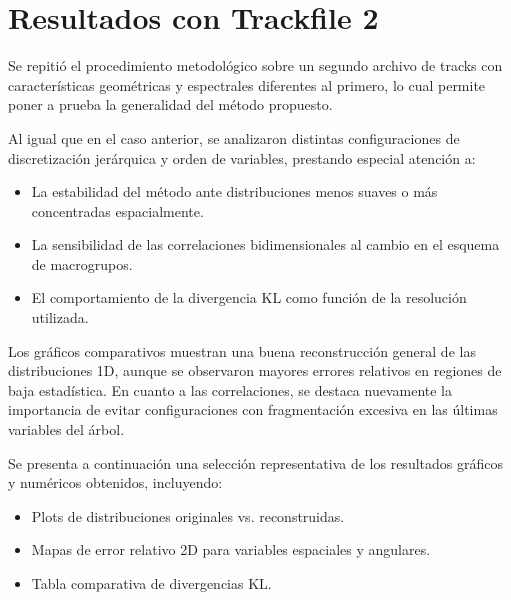 \section{Resultados con Trackfile 2}
\label{sec:resultados-track2}

Se repitió el procedimiento metodológico sobre un segundo archivo de tracks con características geométricas y espectrales diferentes al primero, lo cual permite poner a prueba la generalidad del método propuesto.

Al igual que en el caso anterior, se analizaron distintas configuraciones de discretización jerárquica y orden de variables, prestando especial atención a:

\begin{itemize}
    \item La estabilidad del método ante distribuciones menos suaves o más concentradas espacialmente.
    \item La sensibilidad de las correlaciones bidimensionales al cambio en el esquema de macrogrupos.
    \item El comportamiento de la divergencia KL como función de la resolución utilizada.
\end{itemize}

Los gráficos comparativos muestran una buena reconstrucción general de las distribuciones 1D, aunque se observaron mayores errores relativos en regiones de baja estadística. En cuanto a las correlaciones, se destaca nuevamente la importancia de evitar configuraciones con fragmentación excesiva en las últimas variables del árbol.

Se presenta a continuación una selección representativa de los resultados gráficos y numéricos obtenidos, incluyendo:

\begin{itemize}
    \item Plots de distribuciones originales vs. reconstruidas.
    \item Mapas de error relativo 2D para variables espaciales y angulares.
    \item Tabla comparativa de divergencias KL.
\end{itemize}


